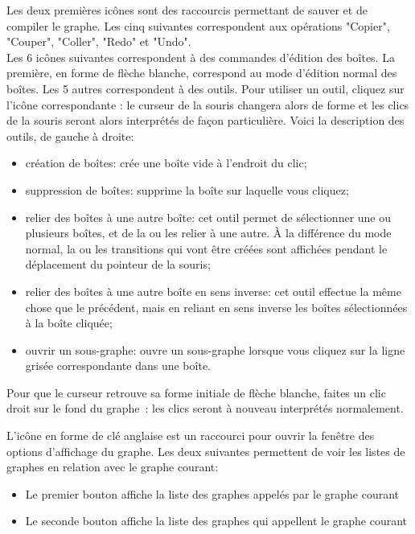 \noindent Les deux premières icônes sont des raccourcis permettant de sauver et de compiler le
graphe. Les cinq suivantes correspondent aux opérations "Copier", "Couper", "Coller", "Redo" et
"Undo".\\

Les 6 icônes suivantes correspondent à des commandes d’édition des boîtes. La première,
en forme de flèche blanche, correspond au mode d’édition normal des boîtes. Les 5 autres
correspondent à des outils. Pour utiliser un outil, cliquez sur l’icône correspondante : le
curseur de la souris changera alors de forme et les clics de la souris seront alors interprétés
de façon particulière. Voici la description des outils, de gauche à droite:

\begin{itemize}
  \item création de boîtes: crée une boîte vide à l’endroit du clic;
  \item suppression de boîtes: supprime la boîte sur laquelle vous cliquez;
  \item relier des boîtes à une autre boîte: cet outil permet de sélectionner une ou plusieurs
boîtes, et de la ou les relier à une autre. À la différence du mode normal, la ou les
transitions qui vont être créées sont affichées pendant le déplacement du pointeur de
la souris;
  \item relier des boîtes à une autre boîte en sens inverse: cet outil effectue la même chose que
le précédent, mais en reliant en sens inverse les boîtes sélectionnées à la boîte cliquée;
  \item ouvrir un sous-graphe: ouvre un sous-graphe lorsque vous cliquez sur la ligne grisée
correspondante dans une boîte.
\end{itemize}

\noindent Pour que le curseur retrouve sa forme initiale de flèche blanche, faites un clic droit sur le fond du graphe~:
les clics seront à nouveau interprétés normalement.

L'icône en forme de clé anglaise est un raccourci pour ouvrir la fenêtre des options d'affichage
du graphe. Les deux suivantes permettent de voir les listes de graphes en relation avec le
graphe courant:

\begin{itemize}
\item Le premier bouton affiche la liste des graphes appelés par le graphe courant
\item Le seconde bouton affiche la liste des graphes qui appellent le graphe courant
\end{itemize}

